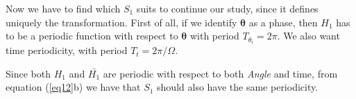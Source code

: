 	Now we have to find which $S_1$ suits to continue our study, since it defines uniquely the transformation. First of all, if we identify $\bm{\theta}$ as a phase, then $H_1$ has to be a periodic function with respect to $\bm{\theta}$ with period $T_{\theta_i} = 2\pi$. We also want time periodicity, with period $T_t = 2\pi/\Omega$.
	
	Since both $H_1$ and $\bar{H_1}$ are periodic with respect to both \textit{Angle} and time, from equation (\ref{eq12}b) we have that $S_1$ should also have the same periodicity. 
	

 	